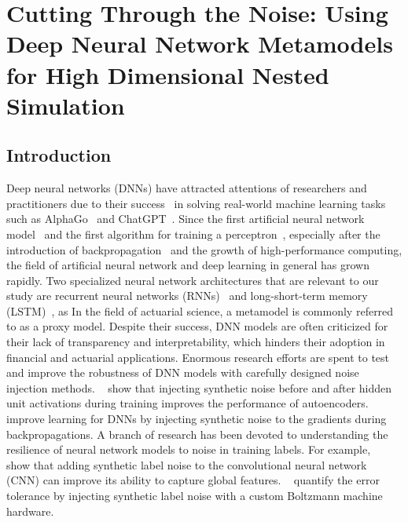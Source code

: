 \chapter{Cutting Through the Noise: Using Deep Neural Network Metamodels for High Dimensional Nested Simulation}
\label{chap:project2}


\section{Introduction}

Deep neural networks (DNNs) have attracted attentions of researchers and practitioners due to their success~\citep{hastie2009elements,lecun2015deep} in solving real-world machine learning tasks such as AlphaGo~\citep{silver2016mastering} and ChatGPT~\citep{chatgpt}.
Since the first artificial neural network model~\citep{mcculloch1943logical} and the first algorithm for training a perceptron~\citep{rosenblatt1958perceptron}, especially after the introduction of backpropagation~\citep{rumelhart1985learning} and the growth of high-performance computing, the field of artificial neural network and deep learning in general has grown rapidly.
Two specialized neural network architectures that are relevant to our study are recurrent neural networks (RNNs)~\citep{williams1989learning,sutskever2014sequence} and long-short-term memory (LSTM)~\citep{hochreiter1997long,chung2014empirical}, as In the field of actuarial science, a metamodel is commonly referred to as a proxy model.
Despite their success, DNN models are often criticized for their lack of transparency and interpretability, which hinders their adoption in financial and actuarial applications.
Enormous research efforts are spent to test and improve the robustness of DNN models with carefully designed noise injection methods.
~\cite{poole2014analyzing} show that injecting synthetic noise before and after hidden unit activations during training improves the performance of autoencoders.
~\cite{neelakantan2015adding} improve learning for DNNs by injecting synthetic noise to the gradients during backpropagations.
A branch of research has been devoted to understanding the resilience of neural network models to noise in training labels.
For example,~\cite{luo2016understanding} show that adding synthetic label noise to the convolutional neural network (CNN) can improve its ability to capture global features. 
~\cite{srivastava2014dropout} quantify the error tolerance by injecting synthetic label noise with a custom Boltzmann machine hardware.
